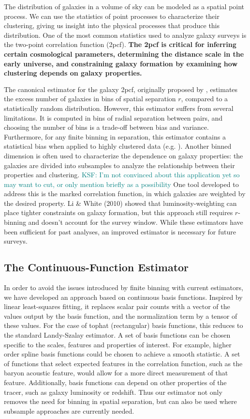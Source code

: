 \documentclass[12pt, fullpage, letterpaper]{article}
\newcommand{\KSF}[1]{\textcolor{teal}{KSF: #1}}
\newcommand{\cf}{2pcf\xspace}
\begin{document}
The distribution of galaxies in a volume of sky can be modeled as a spatial point process.
We can use the statistics of point processes to characterize their clustering, giving us insight into the physical processes that produce this distribution.
One of the most common statistics used to analyze galaxy surveys is the two-point correlation function (\cf). 
\textbf{The \cf is critical for inferring certain cosmological parameters, determining the distance scale in the early universe, and constraining galaxy formation by examining how clustering depends on galaxy properties.}
 
The canonical estimator for the galaxy \cf, originally proposed by \citep{LandySzalay1993}, estimates the excess number of galaxies in bins of spatial separation $r$, compared to a statistically random distribution.
However, this estimator suffers from several limitations. 
It is computed in bins of radial separation between pairs, and choosing the number of bins is a trade-off between bias and variance.
Furthermore, for any finite binning in separation, this estimator contains a statistical bias when applied to highly clustered data (e.g. \citealt{Kerscher1998}).
Another binned dimension is often used to characterize the dependence on galaxy properties: the galaxies are divided into subsamples to analyze the relationship between their properties and clustering. 
\KSF{I'm not convinced about this application yet so may want to cut, or only mention briefly as a possibility}
One tool developed to address this is the marked correlation function, in which galaxies are weighted by the desired property.
Li \& White (2010) showed that luminosity-weighting can place tighter constraints on galaxy formation, but this approach still requires $r$-binning and doesn't account for the survey window.
While these estimators have been sufficient for past analyses, an improved estimator is necessary for future surveys.

\subsection{The Continuous-Function Estimator}

In order to avoid the issues introduced by finite binning with current estimators, we have developed an approach based on continuous basis functions. 
Inspired by linear least-squares fitting, it replaces scalar pair counts with a vector of the values output by the basis function, and the normalization term by a tensor of these values.
For the case of tophat (rectangular) basis functions, this reduces to the standard Landy-Szalay estimator.
A set of basis functions can be chosen specific to the scales, features and properties of interest.
For example, higher order spline basis functions could be chosen to achieve a smooth statistic. 
A set of functions that select expected features in the correlation function, such as the baryon acoustic feature, would allow for a more direct measurement of that feature.
Additionally, basis functions can depend on other properties of the tracer, such as galaxy luminosity or redshift.
Thus our estimator not only removes the need for binning in spatial separation, but can also be used where subsample approaches are currently needed.
\end{document}
